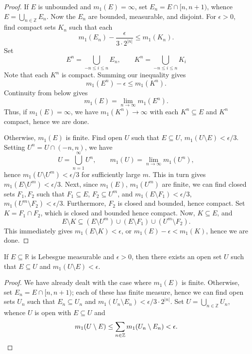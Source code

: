 \documentclass[11pt]{article}
\newcommand{\R}{\mathbb{R}}
\newcommand{\Z}{\mathbb{Z}}
\theoremstyle{definition}
\theoremstyle{remark}
\numberwithin{equation}{section}
\begin{document}
\begin{proof}
        If $E$ is unbounded and $m_1(E) = \infty$, set $E_n = E \cap [n, n + 1)$,
        whence $E = \bigcup_{n \in \Z} E_n$. Now the $E_n$ are bounded, measurable,
        and disjoint. For $\epsilon > 0$, find compact sets $K_n$ such that each \[
            m_1(E_n) - \frac{\epsilon}{3\cdot 2^{|n|}} \leq m_1(K_n).
        \] Set \[
            E^n = \bigcup_{-n \leq i \leq n} E_n, \qquad
            K^n = \bigcup_{-n \leq i \leq n} K_i
        \] Note that each $K^n$ is compact. Summing our inequality gives \[
            m_1(E^n) - \epsilon \leq m_1(K^n).
        \] Continuity from below gives \[
            m_1(E) = \lim_{n \to \infty} m_1(E^n).
        \] Thus, if $m_1(E) = \infty$, we have $m_1(K^n) \to \infty$ with each $K^n
        \subseteq E$ and $K^n$ compact, hence we are done.

        Otherwise, $m_1(E)$ is finite. Find open $U$ such that $E \subseteq U$,
        $m_1(U\setminus E) < \epsilon/3$. Setting $U^n = U \cap (-n, n)$, we have \[
            U = \bigcup_{n = 1}^\infty U^n, \qquad 
            m_1(U) = \lim_{n \to \infty} m_1(U^n),
        \] hence $m_1(U\setminus U^m) < \epsilon/3$ for sufficiently large $m$. This
        in turn gives $m_1(E\setminus U^m) < \epsilon/3$. Next, since $m_1(E)$,
        $m_1(U^m)$ are finite, we can find closed sets $F_1, F_2$ such that $F_1
        \subseteq E$, $F_2 \subseteq U^m$, and $m_1(E\setminus F_1) < \epsilon/3$,
        $m_1(U^m\setminus F_2) < \epsilon/3$. Furthermore, $F_2$ is closed and
        bounded, hence compact. Set $K = F_1 \cap F_2$, which is closed and bounded
        hence compact. Now, $K \subseteq E$, and \[
            E\setminus K \subseteq (E\setminus U^m) \cup (E \setminus F_1) \cup
            (U^m\setminus F_2).
        \] This immediately gives $m_1(E\setminus K) < \epsilon$, or $m_1(E) -
        \epsilon < m_1(K)$, hence we are done.
    \end{proof}

    \begin{corollary}
        If $E \subseteq \R$ is Lebesgue measurable and $\epsilon > 0$, then there
        exists an open set $U$ such that $E \subseteq U$ and $m_1(U \setminus E) <
        \epsilon$.
    \end{corollary}
    \begin{proof}
        We have already dealt with the case where $m_1(E)$ is finite. Otherwise, set
        $E_n = E \cap [n, n + 1)$; each of these has finite measure, hence we can
        find open sets $U_n$ such that $E_n \subseteq U_n$ and $m_1(U_n\setminus E_n)
        < \epsilon / 3\cdot 2^{|n|}$. Set $U = \bigcup_{n \in \Z} U_n$, whence $U$ is
        open with $E \subseteq U$ and \[
            m_1(U\setminus E) \leq \sum_{n \in \Z} m_1(U_n\setminus E_n) < \epsilon.
            \qedhere
        \] 
    \end{proof}
    
\end{document}

